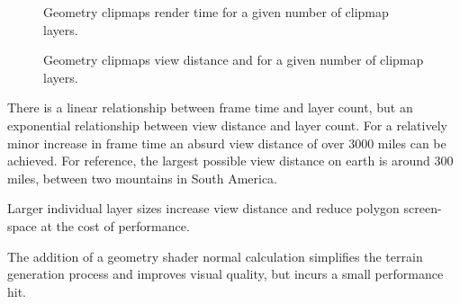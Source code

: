 \begin{figure}
	\centering
{}
	\caption{
		Geometry clipmaps render time for a given number of clipmap layers.
	}
	\label{fig:clipmaps_plot_1}
\end{figure}

\begin{figure}
	\centering
{}
	\caption{
		Geometry clipmaps view distance and for a given number of clipmap layers.
	}
	\label{fig:clipmaps_plot_2}
\end{figure}

There is a linear relationship between frame time and layer count, but an exponential relationship between view distance and layer count.
For a relatively minor increase in frame time an absurd view distance of over 3000 miles can be achieved.
For reference, the largest possible view distance on earth is around 300 miles, between two mountains in South America. \cite{viewdistancemaxearth}

Larger individual layer sizes increase view distance and reduce polygon screen-space at the cost of performance.

The addition of a geometry shader normal calculation simplifies the terrain generation process and improves visual quality, but incurs a small performance hit.


